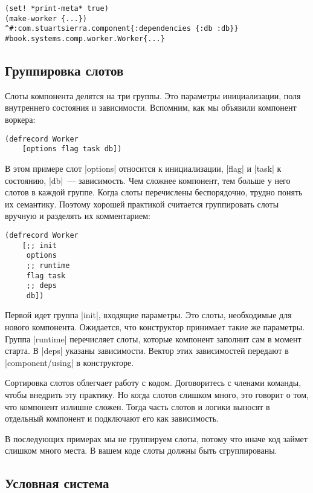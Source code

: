 \begin{verbatim}
(set! *print-meta* true)
(make-worker {...})
^#:com.stuartsierra.component{:dependencies {:db :db}}
#book.systems.comp.worker.Worker{...}
\end{verbatim}

\subsection{Группировка слотов}

Слоты компонента делятся на три группы. Это параметры инициализации, поля
внутреннего состояния и зависимости. Вспомним, как мы объявили компонент
воркера:

\begin{verbatim}
(defrecord Worker
    [options flag task db])
\end{verbatim}

В этом примере слот \spverb|options| относится к инициализации, \spverb|flag| и \spverb|task| к
состоянию, \spverb|db|~--- зависимость. Чем сложнее компонент, тем больше у него слотов в
каждой группе. Когда слоты перечислены беспорядочно, трудно понять их
семантику. Поэтому хорошей практикой считается группировать слоты вручную и
разделять их комментарием:

\begin{verbatim}
(defrecord Worker
    [;; init
     options
     ;; runtime
     flag task
     ;; deps
     db])
\end{verbatim}

Первой идет группа \spverb|init|, входящие параметры. Это слоты, необходимые для нового
компонента. Ожидается, что конструктор принимает такие же параметры. Группа
\spverb|runtime| перечисляет слоты, которые компонент заполнит сам в момент старта. В
\spverb|deps| указаны зависимости. Вектор этих зависимостей передают в
\spverb|component/using| в конструкторе.

Сортировка слотов облегчает работу с кодом. Договоритесь с членами команды,
чтобы внедрить эту практику. Но когда слотов слишком много, это говорит о том,
что компонент излишне сложен. Тогда часть слотов и логики выносят в отдельный
компонент и подключают его как зависимость.

В последующих примерах мы не группируем слоты, потому что иначе код займет
слишком много места. В вашем коде слоты должны быть сгруппированы.

\subsection{Условная система}

